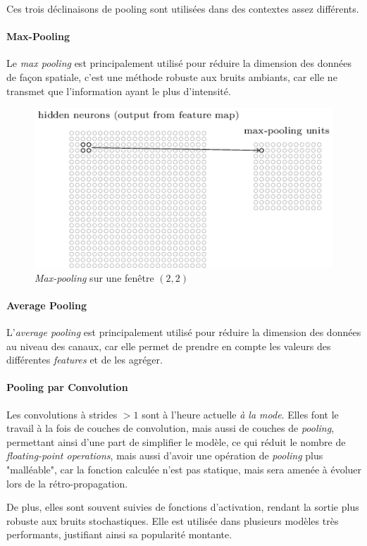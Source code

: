 \documentclass[a4paper, 11pt]{report}
\begin{document}
Ces trois déclinaisons de pooling sont utilisées dans des contextes assez différents.
\paragraph{Max-Pooling}
Le \emph{max pooling} est principalement utilisé pour réduire la dimension des données de façon spatiale, c'est une méthode robuste aux bruits ambiants, car elle ne transmet que l'information ayant le plus d'intensité.
\begin{figure}[H]
	\centering
	\includegraphics[scale=0.6]{Images/Pooling_Layer.png}
	\caption{\emph{Max-pooling} sur une fenêtre $(2,2)$}
\end{figure}
\paragraph{Average Pooling}
L'\emph{average pooling} est principalement utilisé pour réduire la dimension des données au niveau des canaux, car elle permet de prendre en compte les valeurs des différentes \emph{features} et de les agréger.
\paragraph{Pooling par Convolution}
Les convolutions à strides $>1$ sont à l'heure actuelle \emph{à la mode}. Elles font le travail à la fois de couches de convolution, mais aussi de couches de \emph{pooling}, permettant ainsi d'une part de simplifier le modèle, ce qui réduit le nombre de \emph{floating-point operations}, mais aussi d'avoir une opération de \emph{pooling} plus "malléable", car la fonction calculée n'est pas statique, mais sera amenée à évoluer lors de la rétro-propagation.

De plus, elles sont souvent suivies de fonctions d'activation, rendant la sortie plus robuste aux bruits stochastiques.
Elle est utilisée dans plusieurs modèles très performants, justifiant ainsi sa popularité montante.
\end{document}
